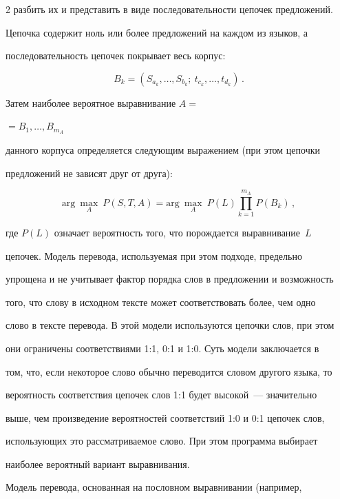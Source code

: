 \begin{multicols}{2}
разбить их и представить в виде последовательности цепочек предложений.


Цепочка содержит ноль или более предложений на каждом из языков, а


последовательность цепочек покрывает весь корпус:


$$


B_k = (S_{a_k},\ldots , S_{b_k};\ t_{c_k},\ldots , t_{d_k})\,.


$$





Затем наиболее вероятное выравнивание $A=$\linebreak


$=B_1,\ldots , B_{m_A}$


данного корпуса определяется следующим выражением (при этом цепочки


предложений не зависят друг от друга):


$$


\mathrm{arg}\ \underset{A}{\max}\ P(S,T,A) = \mathrm{arg}\


\underset{A}{\max}\ P(L)\prod\limits_{k=1}^{m_A} P(B_k)\,,


$$


где $P(L)$ означает вероятность того, что порождается выравнивание~$L$


цепочек. Модель перевода, используемая при этом подходе, предельно


упрощена и не учитывает фактор порядка слов в предложении и возможность


того, что слову в исходном тексте может соответствовать более, чем одно


слово в тексте перевода. В этой модели используются цепочки слов, при этом


они ограничены соответствиями 1:1, 0:1 и 1:0. Суть модели заключается в


том, что, если некоторое слово обычно переводится словом другого языка, то


вероятность соответствия цепочек слов 1:1 будет высокой~--- значительно


выше, чем произведение вероятностей соответствий 1:0 и 0:1 цепочек слов,


использующих это рассматриваемое слово. При этом программа выбирает


наиболее вероятный вариант выравнивания.





Модель перевода, основанная на пословном выравнивании (например,



\end{multicols}
